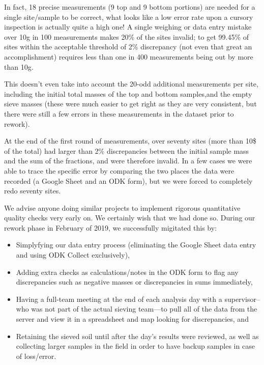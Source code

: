 \documentclass[a4paper,12pt]{article}
\begin{document}
In fact, 18 precise measurements (9 top and 9 bottom portions) are needed for a single site/sample to be correct, what looks like a low error rate upon a cursory inspection is actually quite a high one! A single weighing or data entry mistake over 10g in 100 measurements makes 20\% of the sites invalid; to get 99.45\% of sites within the acceptable threshold of 2\% discrepancy (not even that great an accomplishment) requires less than one in 400 measurements being out by more than 10g. 

This doesn't even take into account the 20-odd additional measurements per site, including the initial total masses of the top and bottom samples,and the empty sieve masses (these were much easier to get right as they are very consistent, but there were still a few errors in these measurements in the dataset prior to rework).

At the end of the first round of measurements, over seventy sites (more than 10\$ of the total) had larger than 2\% discrepancies between the initial sample mass and the sum of the fractions, and were therefore invalid. In a few cases we were able to trace the specific error by comparing the two places the data were recorded (a Google Sheet and an ODK form), but we were forced to completely redo seventy sites.

We advise anyone doing similar projects to implement rigorous quantitative quality checks very early on. We certainly wish that we had done so. During our rework phase in February of 2019, we successfully migitated this by:

\begin{itemize}
  \item Simplyfying our data entry process (eliminating the Google Sheet data entry and using ODK Collect exclusively),
  \item Adding extra checks as calculations/notes in the ODK form to flag any discrepancies such as negative masses or discrepancies in sums immediately,
  \item Having a full-team meeting at the end of each analysis day with a supervisor--who was not part of the actual sieving team---to pull all of the data from the server and view it in a spreadsheet and map looking for discrepancies, and
  \item Retaining the sieved soil until after the day's results were reviewed, as well as collecting larger samples in the field in order to have backup samples in case of loss/error.
\end{itemize}
\end{document}
